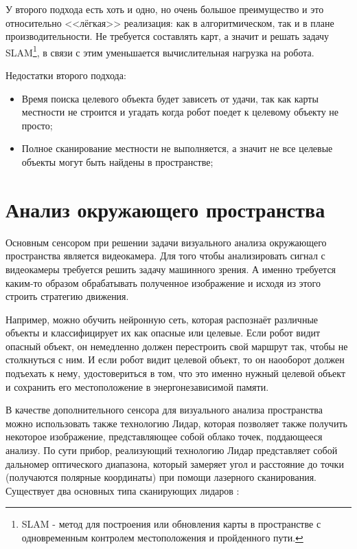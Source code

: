 У второго подхода есть хоть и одно, но очень большое преимущество и это относительно <<лёгкая>> реализация: как в алгоритмическом, так и в плане производительности. Не требуется составлять карт, а значит и решать задачу SLAM\footnote{SLAM - метод для построения или обновления карты в пространстве с одновременным контролем местоположения и пройденного пути\cite[с. 9]{aycock2010simultaneous}.}, в связи с этим уменьшается вычислительная нагрузка на робота.

Недостатки второго подхода:
\begin{itemize}
\item Время поиска целевого объекта будет зависеть от удачи, так как карты местности не строится и угадать когда робот поедет к целевому объекту не просто;
\item Полное сканирование местности не выполняется, а значит не все целевые объекты могут быть найдены в пространстве;
\end{itemize}

\section{Анализ окружающего пространства} \label{sec:environment-analysis}

Основным сенсором при решении задачи визуального анализа окружающего пространства является видеокамера. Для того чтобы анализировать сигнал с видеокамеры требуется решить задачу машинного зрения. А именно требуется каким-то образом обрабатывать полученное изображение и исходя из этого строить стратегию движения.

Например, можно обучить нейронную сеть, которая распознаёт различные объекты и классифицирует их как опасные или целевые. Если робот видит опасный объект, он немедленно должен перестроить свой маршрут так, чтобы не столкнуться с ним. И если робот видит целевой объект, то он наооборот должен подъехать к нему, удостовериться в том, что это именно нужный целевой объект и сохранить его местоположение в энергонезависимой памяти.

В качестве дополнительного сенсора для визуального анализа пространства можно использовать также технологию Лидар, которая позволяет также получить некоторое изображение, представляющее собой облако точек, поддающееся анализу. По сути прибор, реализующий технологию Лидар представляет собой дальномер оптического диапазона, который замеряет угол и расстояние до точки (получаются полярные координаты) при помощи лазерного сканирования. Существует два основных типа сканирующих лидаров \cite[с. 702]{xiao2020proceedings}:


